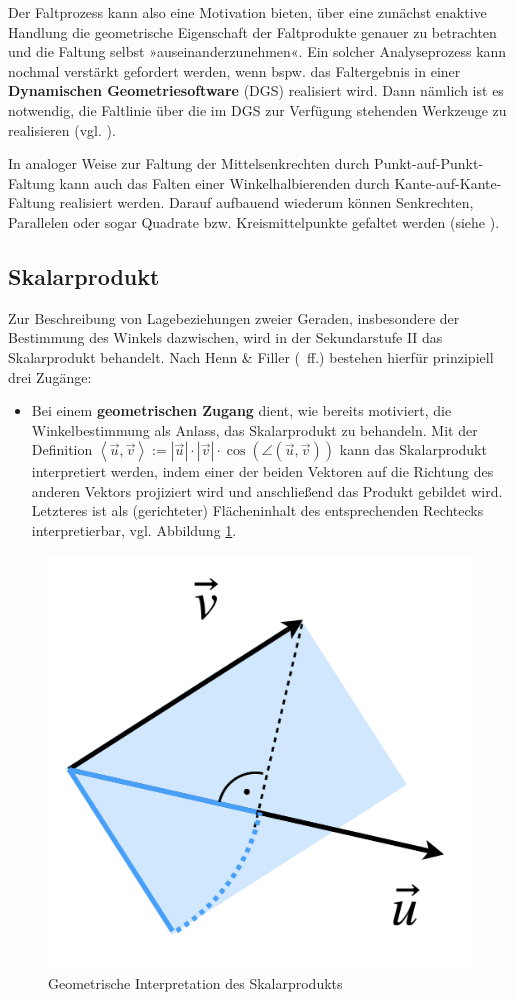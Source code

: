 \documentclass[
]{scrbook}
\providecommand{\tightlist}{%
  \setlength{\itemsep}{0pt}\setlength{\parskip}{0pt}}
\theoremstyle{definition}
\theoremstyle{definition}
\theoremstyle{definition}
\theoremstyle{definition}
\theoremstyle{remark}
\begin{document}
Der Faltprozess kann also eine Motivation bieten, über eine zunächst enaktive Handlung die geometrische Eigenschaft der Faltprodukte genauer zu betrachten und die Faltung selbst »auseinanderzunehmen«. Ein solcher Analyseprozess kann nochmal verstärkt gefordert werden, wenn bspw. das Faltergebnis in einer \textbf{Dynamischen Geometriesoftware} (DGS) realisiert wird. Dann nämlich ist es notwendig, die Faltlinie über die im DGS zur Verfügung stehenden Werkzeuge zu realisieren (vgl. ).

In analoger Weise zur Faltung der Mittelsenkrechten durch Punkt-auf-Punkt-Faltung kann auch das Falten einer Winkelhalbierenden durch Kante-auf-Kante-Faltung realisiert werden. Darauf aufbauend wiederum können Senkrechten, Parallelen oder sogar Quadrate bzw. Kreismittelpunkte gefaltet werden (siehe ).

\subsection{Skalarprodukt}\label{skalarprodukt}

Zur Beschreibung von Lagebeziehungen zweier Geraden, insbesondere der Bestimmung des Winkels dazwischen, wird in der Sekundarstufe II das Skalarprodukt behandelt. Nach Henn \& Filler (~ff.) bestehen hierfür prinzipiell drei Zugänge:

\begin{itemize}
\tightlist
\item
  Bei einem \textbf{geometrischen Zugang} dient, wie bereits motiviert, die Winkelbestimmung als Anlass, das Skalarprodukt zu behandeln. Mit der Definition \(\left<\vec u, \vec v\right> := |\vec u|\cdot |\vec v|\cdot \cos(\angle(\vec u,\vec v))\) kann das Skalarprodukt interpretiert werden, indem einer der beiden Vektoren auf die Richtung des anderen Vektors projiziert wird und anschließend das Produkt gebildet wird. Letzteres ist als (gerichteter) Flächeninhalt des entsprechenden Rechtecks interpretierbar, vgl. Abbildung \ref{fig:Skalarprodukt}.
\end{itemize}

\begin{figure}

{\centering \includegraphics[width=0.3\linewidth]{pictures/11-Skalarprodukt} 

}

\caption{Geometrische Interpretation des Skalarprodukts}\label{fig:Skalarprodukt}
\end{figure}
\end{document}
